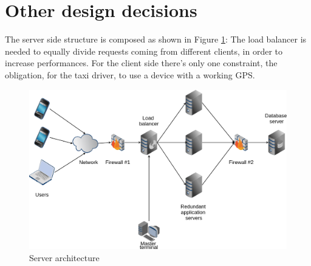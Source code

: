 \section{Other design decisions}
The server side structure is composed as shown in Figure \ref{fig:hwarch}:
The load balancer is needed to equally divide requests coming from different clients, in order to increase performances.
For the client side there's only one constraint, the obligation, for the taxi driver, to use a device with a working GPS.

\begin{figure} [h]
  \centering
  \includegraphics[scale=0.35]{../../architecture/architecture.png}
\caption{Server architecture \label{fig:hwarch}}
\end{figure}
